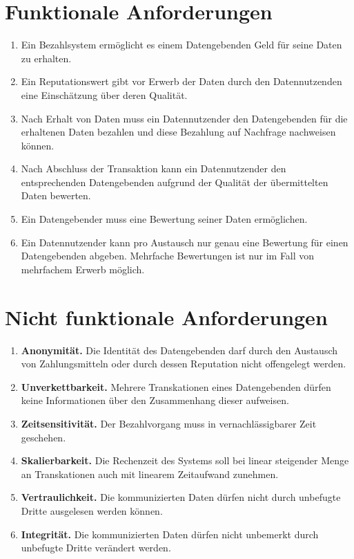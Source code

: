 \documentclass[
	fontsize=12pt,
	headings=small,
	parskip=half,           %
	bibliography=totoc,
	numbers=noenddot,       %
	open=any,               %
]{scrreprt}
\begin{document}
\section{Funktionale Anforderungen}
\label{enum:req:funktional}
\begin{enumerate}
    \item Ein Bezahlsystem ermöglicht es einem Datengebenden Geld für seine Daten zu erhalten.
    \item Ein Reputationswert gibt vor Erwerb der Daten durch den Datennutzenden eine Einschätzung über deren Qualität.
    \item Nach Erhalt von Daten muss ein Datennutzender den Datengebenden für die erhaltenen Daten bezahlen und diese Bezahlung auf Nachfrage nachweisen können.
    \item Nach Abschluss der Transaktion kann ein Datennutzender den entsprechenden Datengebenden aufgrund der Qualität der übermittelten Daten bewerten.
    \item Ein Datengebender muss eine Bewertung seiner Daten ermöglichen.
    \item Ein Datennutzender kann pro Austausch nur genau eine Bewertung für einen Datengebenden abgeben. Mehrfache Bewertungen ist nur im Fall von mehrfachem Erwerb möglich.
\end{enumerate}

\section{Nicht funktionale Anforderungen}
\label{enum:req:nichtfunktional}
\begin{enumerate}
    \item \textbf{Anonymität.} Die Identität des Datengebenden darf durch den Austausch von Zahlungsmitteln oder durch dessen Reputation nicht offengelegt werden.
    \item \textbf{Unverkettbarkeit.} Mehrere Transkationen eines Datengebenden dürfen keine Informationen über den Zusammenhang dieser aufweisen. 
    \item \textbf{Zeitsensitivität.} Der Bezahlvorgang muss in vernachlässigbarer Zeit geschehen.
    \item \textbf{Skalierbarkeit.} Die Rechenzeit des Systems soll bei linear steigender Menge an Transkationen auch mit linearem Zeitaufwand zunehmen.
    \item \textbf{Vertraulichkeit.} Die kommunizierten Daten dürfen nicht durch unbefugte Dritte ausgelesen werden können.
    \item \textbf{Integrität.} Die kommunizierten Daten dürfen nicht unbemerkt durch unbefugte Dritte verändert werden.
\end{enumerate}
\end{document}
